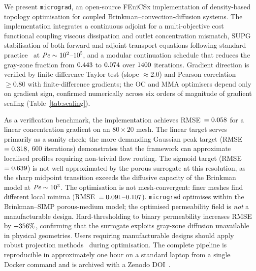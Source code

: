 We present \texttt{micrograd}, an open-source FEniCSx implementation
of density-based topology optimisation for coupled Brinkman--convection-diffusion systems.
The implementation integrates a continuous adjoint for a multi-objective
cost functional coupling viscous dissipation and outlet concentration mismatch,
SUPG stabilisation of both forward and adjoint transport equations
following standard practice~\cite{donea2003} at
$\mathit{Pe}\sim10^2$--$10^5$,
and a modular continuation schedule that reduces the gray-zone fraction
from $0.443$ to $0.074$ over $1400$ iterations.
Gradient direction is verified by finite-difference Taylor test (slope $\approx 2.0$)
and Pearson correlation $\geq 0.80$ with finite-difference gradients;
the OC and MMA optimisers depend only on gradient sign, confirmed numerically
across six orders of magnitude of gradient scaling (Table~\ref{tab:scaling}).

As a verification benchmark, the implementation achieves
RMSE~$=0.058$ for a linear concentration gradient
on an $80\times20$ mesh.
The linear target serves primarily as a sanity check;
the more demanding Gaussian peak target
(RMSE~$=0.318$, 600 iterations) demonstrates
that the framework can approximate localised profiles
requiring non-trivial flow routing.
The sigmoid target (RMSE~$=0.639$) is not well
approximated by the porous surrogate at this resolution,
as the sharp midpoint transition exceeds the diffusive
capacity of the Brinkman model at $\mathit{Pe}\sim10^3$.
The optimisation is not mesh-convergent: finer meshes find
different local minima (RMSE~$=0.091$--$0.107$).
\texttt{micrograd} optimises within the Brinkman--SIMP porous-medium model;
the optimised permeability field is \emph{not} a manufacturable design.
Hard-thresholding to binary permeability increases RMSE by $+356\%$,
confirming that the surrogate exploits gray-zone diffusion unavailable
in physical geometries.
Users requiring manufacturable designs should apply robust projection
methods~\cite{wang2011} during optimisation.
The complete pipeline is reproducible in approximately one hour on a standard laptop
from a single Docker command and is archived with a Zenodo DOI~\cite{micrograd2025zenodo}.
